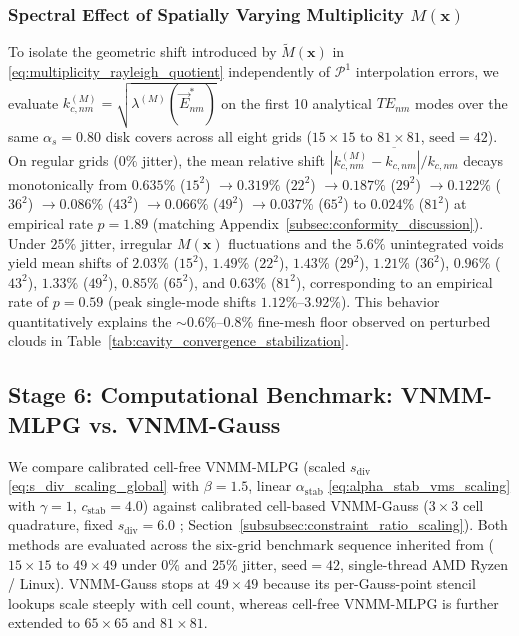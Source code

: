\documentclass[VANCOUVER]{USG}
\begin{document}
\subsubsection{Spectral Effect of Spatially Varying Multiplicity \texorpdfstring{$M(\mathbf{x})$}{M(x)}}
\label{subsubsec:multiplicity_rayleigh_effect}

To isolate the geometric shift introduced by $\widetilde{M}(\mathbf{x})$ in \eqref{eq:multiplicity_rayleigh_quotient} independently of $\mathcal{P}^1$ interpolation errors, we evaluate $k_{c,nm}^{(M)} = \sqrt{\lambda^{(M)}(\vec{E}_{nm}^*)}$ on the first 10 analytical $TE_{nm}$ modes over the same $\alpha_s = 0.80$ disk covers across all eight grids ($15\times 15$ to $81\times 81$, $\text{seed}=42$). On regular grids ($0\%$ jitter), the mean relative shift $\overline{|k_{c,nm}^{(M)} - k_{c,nm}|/k_{c,nm}}$ decays monotonically from $0.635\%$ ($15^2$) $\to 0.319\%$ ($22^2$) $\to 0.187\%$ ($29^2$) $\to 0.122\%$ ($36^2$) $\to 0.086\%$ ($43^2$) $\to 0.066\%$ ($49^2$) $\to 0.037\%$ ($65^2$) to $0.024\%$ ($81^2$) at empirical rate $p = 1.89$ (matching Appendix~\ref{subsec:conformity_discussion}). Under $25\%$ jitter, irregular $M(\mathbf{x})$ fluctuations and the $5.6\%$ unintegrated voids yield mean shifts of $2.03\%$ ($15^2$), $1.49\%$ ($22^2$), $1.43\%$ ($29^2$), $1.21\%$ ($36^2$), $0.96\%$ ($43^2$), $1.33\%$ ($49^2$), $0.85\%$ ($65^2$), and $0.63\%$ ($81^2$), corresponding to an empirical rate of $p = 0.59$ (peak single-mode shifts $1.12\%\text{--}3.92\%$). This behavior quantitatively explains the $\sim 0.6\%\text{--}0.8\%$ fine-mesh floor observed on perturbed clouds in Table~\ref{tab:cavity_convergence_stabilization}.

\subsection{Stage 6: Computational Benchmark: VNMM-MLPG vs. VNMM-Gauss}
\label{subsec:stage6_benchmark}

We compare calibrated cell-free VNMM-MLPG (scaled $s_{\mathrm{div}}$ \eqref{eq:s_div_scaling_global} with $\beta = 1.5$, linear $\alpha_{\mathrm{stab}}$ \eqref{eq:alpha_stab_vms_scaling} with $\gamma = 1$, $c_{\mathrm{stab}} = 4.0$) against calibrated cell-based VNMM-Gauss ($3 \times 3$ cell quadrature, fixed $s_{\mathrm{div}} = 6.0$ \cite{stable_vnmm2d_2026}; Section~\ref{subsubsec:constraint_ratio_scaling}). Both methods are evaluated across the six-grid benchmark sequence inherited from \cite{stable_vnmm2d_2026} ($15 \times 15$ to $49 \times 49$ under $0\%$ and $25\%$ jitter, $\text{seed}=42$, single-thread AMD Ryzen / Linux). VNMM-Gauss stops at $49\times 49$ because its per-Gauss-point stencil lookups scale steeply with cell count, whereas cell-free VNMM-MLPG is further extended to $65 \times 65$ and $81 \times 81$.
\end{document}
